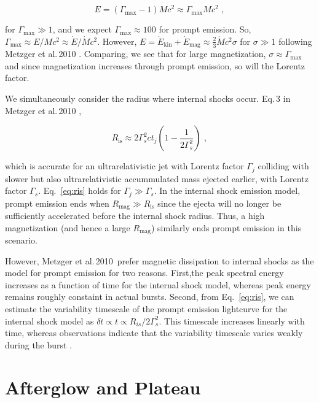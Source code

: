 \documentclass{article}
\begin{document}
\begin{equation} E = (\Gamma_{\mathrm{max}}-1) M c^2 \approx \Gamma_{\mathrm{max}} M c^2 \,\,,
\end{equation}

for $\Gamma_{\mathrm{max}} \gg 1$, and we expect $\Gamma_{\mathrm{max}}\approx 100$ for prompt emission. So, $\Gamma_{\mathrm{max}} \approx E/{M c^2} \approx \dot{E}/\dot{M} c^2$. However, $E=\dot{E}_{\mathrm{kin}}+\dot{E}_{\mathrm{mag}} \approx \frac{2}{3} \dot{M} c^2 \sigma$ for $\sigma \gg 1$ following Metzger et al.\,2010 \cite{Metzger:2010pp}. Comparing, we see that for large magnetization, $\sigma \approx \Gamma_{\mathrm{max}}$ and since magnetization increases through prompt emission, so will the Lorentz factor.

We simultaneously consider the radius where internal shocks occur. Eq.\,3 in Metzger et al.\,2010 \cite{Metzger:2010pp},

\begin{equation}\label{eq:ris}
R_{\mathrm{is}} \approx 2\Gamma_s^2 c t_j\left(1-\frac{1}{2\Gamma_s^2}\right)\,\,,
\end{equation}

which is accurate for an ultrarelativistic jet with Lorentz factor $\Gamma_j$ colliding with slower but also ultrarelativistic accummulated mass ejected earlier, with Lorentz factor $\Gamma_s$. Eq.~\ref{eq:ris} holds for $\Gamma_{j}\gg \Gamma_{s}$. In the internal shock emission model, prompt emission ends when $R_{\mathrm{mag}} \gg R_{\mathrm{is}}$ since the ejecta will no longer be sufficiently accelerated before the internal shock radius. Thus, a high magnetization (and hence a large $R_{\mathrm{mag}}$) similarly ends prompt emission in this scenario.

However, Metzger et al.\,2010\,\cite{Metzger:2010pp} prefer magnetic dissipation to internal shocks as the model for prompt emission for two reasons. First,the peak spectral energy increases as a function of time for the internal shock model, whereas peak energy remains roughly constaint in actual bursts. Second, from Eq.~\ref{eq:ris}, we can estimate the variability timescale of the prompt emission lightcurve for the internal shock model as $\delta t \propto t \propto R_{is}/2 \Gamma_s^2$. This timescale increases linearly with time, whereas observations indicate that the variability timescale varies weakly during the burst \cite{Fenimore:1999su}.

\section{Afterglow and Plateau} \label{sec:ag}
\end{document}
